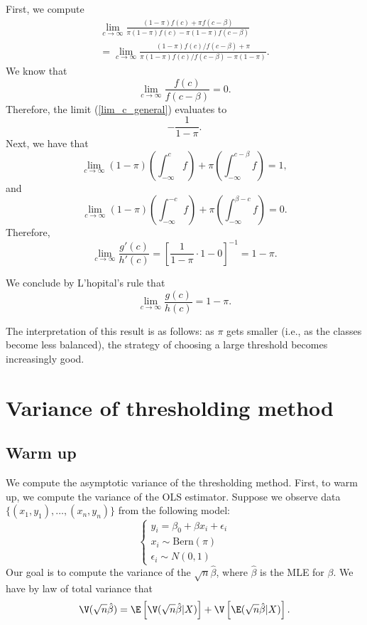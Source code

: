 \documentclass[12pt]{article}
\begin{document}
First, we compute
\begin{multline}\label{lim_c_general}
\lim_{c \to \infty} \frac{ (1-\pi) f(c) + \pi f(c - \beta) }{ \pi (1-\pi) f(c) - \pi (1-\pi) f(c - \beta)} \\ = \lim_{c \to \infty} \frac{ (1-\pi) f(c)/f(c-\beta) + \pi }{ \pi(1-\pi) f(c)/f(c-\beta) - \pi(1-\pi)}.
\end{multline}
We know that $$ \lim_{c \to \infty} \frac{ f(c) }{f(c -\beta)} = 0.$$ Therefore, the limit (\ref{lim_c_general}) evaluates to
$$ -\frac{1}{1-\pi}.$$
Next, we have that
$$ \lim_{c \to \infty} (1-\pi) \left(\int_{-\infty}^c  f \right) + \pi \left( \int_{-\infty}^{c - \beta} f \right) = 1,$$ and
$$ \lim_{c \to \infty} \left(1 - \pi \right) \left( \int_{-\infty}^{-c} f \right) + \pi \left( \int_{-\infty}^{\beta-c} f \right) = 0.$$
Therefore,
$$ \lim_{c \to \infty} \frac{g'(c)}{h'(c)} = \left[ \frac{1}{1-\pi} \cdot 1 - 0\right]^{-1} = 1 - \pi.$$

We conclude by L'hopital's rule that
$$ \lim_{c \to \infty} \frac{g(c)}{h(c)} = 1 - \pi. $$

The interpretation of this result is as follows: as $\pi$ gets smaller (i.e., as the classes become less balanced), the strategy of choosing a large threshold becomes increasingly good.

\section{Variance of thresholding method}

\subsection{Warm up}

We compute the asymptotic variance of the thresholding method. First, to warm up, we compute the variance of the OLS estimator. Suppose we observe data $\{(x_1, y_1), \dots, (x_n, y_n)\}$ from the following model:
$$
\begin{cases}
y_i = \beta_0 + \beta x_i + \epsilon_i \\
x_i \sim \textrm{Bern}(\pi) \\
\epsilon_i \sim N(0,1)
\end{cases}
$$
Our goal is to compute the variance of the $\sqrt{n} \hat{\beta}$, where $\hat{\beta}$ is the MLE for $\beta$. We have by law of total variance that
$$\V(\sqrt{n} \hat{\beta}) = \E\left[ \V(\sqrt{n}\hat{\beta} | X ) \right] + \V \left[ \E ( \sqrt{n} \hat{\beta}|X) \right].$$
\end{document}
